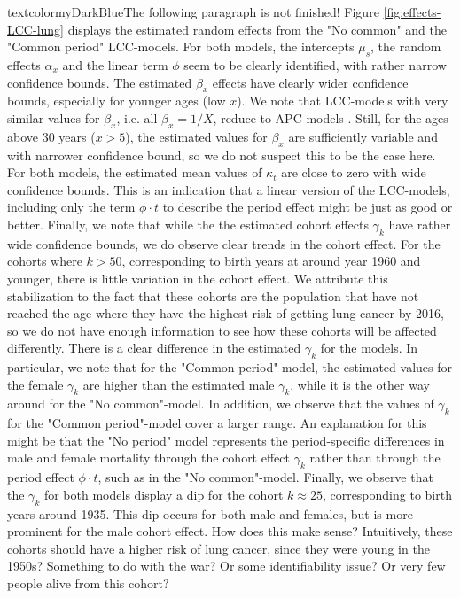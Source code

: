 textcolor{myDarkBlue}{The following paragraph is not finished! }
\newpar Figure \ref{fig:effects-LCC-lung} displays the estimated random effects from the "No common" and the "Common period" LCC-models. For both models, the intercepts $\mu_s$, the random effects $\alpha_x$ and the linear term $\phi$ seem to be clearly identified, with rather narrow confidence bounds. The estimated $\beta_x$ effects have clearly wider confidence bounds, especially for younger ages (low $x$). We note that LCC-models with very similar values for $\beta_x$, i.e. all $\beta_x = 1/X$, reduce to APC-models \parencite{Wisniowski2015}. Still, for the ages above 30 years ($x > 5$), the estimated values for $\beta_x$ are sufficiently variable and with narrower confidence bound, so we do not suspect this to be the case here. For both models, the estimated mean values of $\kappa_t$ are close to zero with wide confidence bounds. This is an indication that a linear version of the LCC-models, including only the term $\phi \cdot t$ to describe the period effect might be just as good or better. Finally, we note that while the the estimated cohort effects $\gamma_k$ have rather wide confidence bounds, we do observe clear trends in the cohort effect. For the cohorts where $k > 50$, corresponding to birth years at around year 1960 and younger, there is little variation in the cohort effect. We attribute this stabilization to the fact that these cohorts are the population that have not reached the age where they have the highest risk of getting lung cancer by 2016, so we do not have enough information to see how these cohorts will be affected differently. There is a clear difference in the estimated $\gamma_k$ for the models. In particular, we note that for the "Common period"-model, the estimated values for the female $\gamma_k$ are higher than the estimated male $\gamma_k$, while it is the other way around for the "No common"-model. In addition, we observe that the values of $\gamma_k$ for the "Common period"-model cover a larger range. An explanation for this might be that the "No period" model represents the period-specific differences in male and female mortality through the cohort effect $\gamma_k$ rather than through the period effect $\phi \cdot t$, such as in the "No common"-model. Finally, we observe that the $\gamma_k$ for both models display a dip for the cohort $k \approx 25$, corresponding to birth years around 1935. This dip occurs for both male and females, but is more prominent for the male cohort effect. \textcolor{myDarkGreen}{How does this make sense? Intuitively, these cohorts should have a higher risk of lung cancer, since they were young in the 1950s? Something to do with the war? Or some identifiability issue? Or very few people alive from this cohort? }

